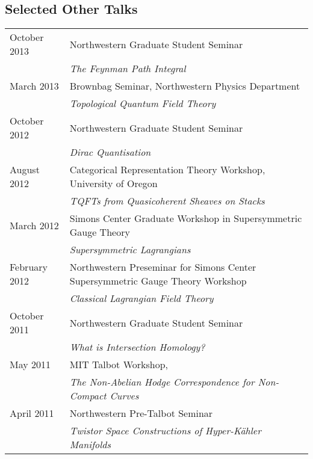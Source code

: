 \documentclass[10pt,oneside]{article}
\newcommand\T{\rule{0pt}{2.6ex}}
\begin{document}
\subsection*{Selected Other Talks}
\begin{tabular}{ll}
October 2013 \T & Northwestern Graduate Student Seminar \\
&\emph{The Feynman Path Integral} \\
March 2013 \T & Brownbag Seminar, Northwestern Physics Department \\
&\emph{Topological Quantum Field Theory} \\
October 2012 \T & Northwestern Graduate Student Seminar \\
&\emph{Dirac Quantisation} \\
August 2012 \T & Categorical Representation Theory Workshop, University of Oregon \\
& \emph{TQFTs from Quasicoherent Sheaves on Stacks} \\
March 2012 \T & Simons Center Graduate Workshop in Supersymmetric Gauge Theory \\
& \emph{Supersymmetric Lagrangians} \\
February 2012 \T & Northwestern Preseminar for Simons Center Supersymmetric Gauge Theory Workshop \\
& \emph{Classical Lagrangian Field Theory} \\
October 2011 \T & Northwestern Graduate Student Seminar \\
&\emph{What is Intersection Homology?} \\
May 2011 \T & MIT Talbot Workshop, \\
&\emph{The Non-Abelian Hodge Correspondence for Non-Compact Curves} \\
April 2011 \T & Northwestern Pre-Talbot Seminar \\
& \emph{Twistor Space Constructions of Hyper-K\"ahler Manifolds}
\end{tabular}
\end{document}
